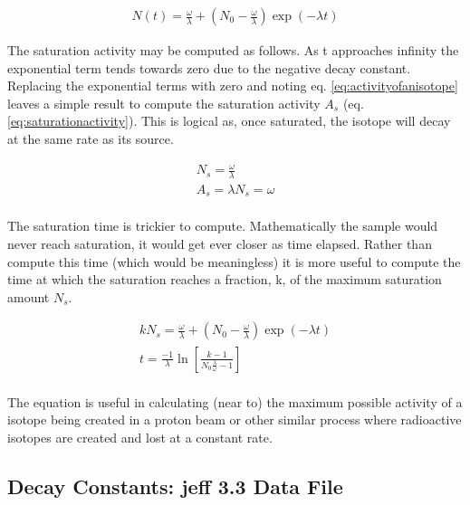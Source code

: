 \begin{equation}
\begin{split}
N(t) = \frac{\omega}{\lambda} + \left(N_{0} - \frac{\omega}{\lambda} \right) \exp(-\lambda t)
\end{split}
\label{eq:decayequationoneisotope}
\end{equation}

The saturation activity may be computed as follows.  As t approaches infinity the exponential term tends towards zero due to the negative decay constant.  Replacing the exponential terms with zero and noting eq. \ref{eq:activityofanisotope} leaves a simple result to compute the saturation activity $A_{s}$ (eq. \ref{eq:saturationactivity}).  This is logical as, once saturated, the isotope will decay at the same rate as its source.

\begin{equation}
\begin{split}
N_{s} = \frac{\omega}{\lambda} \\
A_{s} = \lambda N_{s} = \omega \\
\end{split}
\label{eq:saturationactivity}
\end{equation}

The saturation time is trickier to compute.  Mathematically the sample would never reach saturation, it would get ever closer as time elapsed.  Rather than compute this time (which would be meaningless) it is more useful to compute the time at which the saturation reaches a fraction, k, of the maximum saturation amount $N_{s}$.

\begin{equation}
\begin{split}
k N_{s} = \frac{\omega}{\lambda} + \left(N_{0} - \frac{\omega}{\lambda} \right) \exp(-\lambda t) \\
t = \frac{-1}{\lambda} \ln \left[ \frac{k-1}{N_0 \frac{\lambda}{\omega} - 1} \right] \\
\end{split}
\label{eq:saturationactivity}
\end{equation}

The equation is useful in calculating (near to) the maximum possible activity of a isotope being created in a proton beam or other similar process where radioactive isotopes are created and lost at a constant rate.


\subsection{Decay Constants: \acrfull{jeff} 3.3 Data File}

